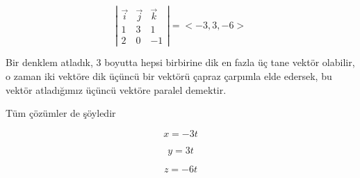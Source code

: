 \documentclass[12pt,fleqn]{article}\usepackage{../../common}
\begin{document}
$$ 
\left|\begin{array}{rrr}
\vec{i} & \vec{j} & \vec{k}  \\
1 & 3 & 1 \\
2 & 0 & -1
\end{array}\right| = < -3,3,-6 >
$$

Bir denklem atladık, 3 boyutta hepsi birbirine dik en fazla üç tane vektör
olabilir, o zaman iki vektöre dik üçüncü bir vektörü çapraz çarpımla elde
edersek, bu vektör atladığımız üçüncü vektöre paralel demektir. 

Tüm çözümler de şöyledir

$$ x = -3t $$

$$ y = 3t $$

$$ z = -6t $$
\end{document}
